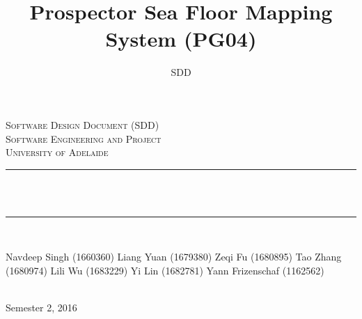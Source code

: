 \documentclass[12pt]{article}
\title{Prospector Sea Floor Mapping System (PG04)}
\author{SDD}
\makeatletter
\let\thetitle\@title
\makeatother
\begin{document}

\begin{titlepage}
	\centering
    \vspace*{0.0 cm}
    \textsc{\LARGE Software Design Document (SDD)}\\[2.0 cm]
	\textsc{\Large Software Engineering and Project}\\[0.5 cm]			
	\textsc{\large University of Adelaide}\\[0.5 cm]
	\rule{\linewidth}{0.2 mm} \\[0.4 cm]
	{ \huge \bfseries \thetitle}\\
	\rule{\linewidth}{0.2 mm} \\[1.5 cm]
	
	\begin{minipage}{0.4\textwidth}
		\begin{center} \large
			Navdeep Singh (1660360)\linebreak
			Liang Yuan (1679380)\linebreak
			Zeqi Fu (1680895)\linebreak
			Tao Zhang (1680974)\linebreak
			Lili Wu (1683229)\linebreak
			Yi Lin (1682781)\linebreak
            Yann Frizenschaf (1162562)\linebreak
			\end{center}
	\end{minipage}\\[2 cm]
	
	{\large Semester 2, 2016}\\[2 cm]
 
	\vfill
	
\end{titlepage}

\end{document}
